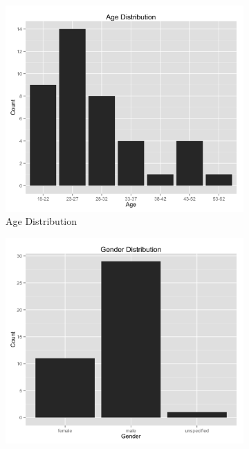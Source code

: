 \documentclass[12pt]{article}
\begin{document}
\begin{figure}[H]
\centering
\begin{subfigure}{.5\textwidth}
    \centering
    \includegraphics[width=1.0\linewidth]{graphs/age.png}
    \caption{Age Distribution}
    \label{agedistribution}
\end{subfigure}%
\begin{subfigure}{.5\textwidth}
    \centering
    \includegraphics[width=1.0\linewidth]{graphs/gender.png}

\end{subfigure}
\end{figure}
\end{document}
